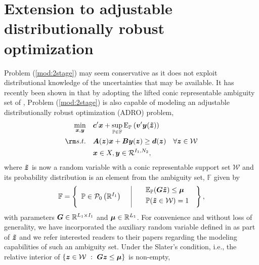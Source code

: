 \documentclass[fleqn,mnsc,blindrev]{informs4}
\newcommand {\Ep}[2]{{\mathrm{E}_{\mathbb{P}_{#1}} \left( #2 \right)}}
\newcommand {\supEp}[1]{\displaystyle \sup_{\mathbb{P} \in \mathbb{F}} \Ep{}{#1}}
\newcommand{\mb}[1]{\mbox{\boldmath \ensuremath{#1}}}
\newcommand{\mbt}[1]{\mb{\tilde{#1}}}
\renewcommand{\Re}{\mathbb{R}}
\begin{document}
		
		\section{Extension to adjustable distributionally robust optimization} \label{sec:ADRO}
Problem (\ref{mod:2stage}) may seem conservative as it does not exploit distributional knowledge of the uncertainties that may be available. It has recently been shown  in \cite{bsz17} that by adopting the lifted conic representable ambiguity set of  \cite{wks14},  Problem (\ref{mod:2stage}) is also capable of modeling an adjustable distributionally robust optimization (ADRO) problem,    
\begin{equation} \label{mod:d2stage}
			\begin{aligned}
				\min_{\boldsymbol{x}, \boldsymbol{y}} \quad & \mb{c}' \mb{x} + \supEp{  \mb{v}'\mb{y}(\mbt{z} )} \\
				{\rm s.t.}\quad &   \mb{A}(\mb{z})\mb{x}+\mb{B}\mb{y}(\mb{z}) \ge \mb{d}(\mb{z}) & \forall \mb{z} \in \mathcal{W}\\
				&\mb{x} \in X, \mb{y}\in \mathcal{R}^{I_1,N_2},
			\end{aligned}
\end{equation}
		where $\mbt{z}$ is now a random variable with a conic representable support set $\mathcal{W}$ and its probability distribution is an element from the ambiguity set, $\mathbb{F}$ given by 
\begin{equation*}
			\mathbb{F}=\left\{
			\begin{array}{lll}
				\mathbb{P}\in\mathcal{P}_{0}\left(\Re^{I_{1}}\right) \enskip & $\vline$ & \enskip
				\begin{array}{l}
					\mathbb{E}_{\mathbb{P}}(\mb{G}\mbt{z}) \leq \mb{\mu} \vspace{3pt}\\
					\mathbb{P}(\mbt{z}\in\mathcal{W})=1 \vspace{3pt}
				\end{array}
			\end{array}
			\right\},
\end{equation*}
		with  parameters $\mb{G} \in \Re^{L_1 \times I_1}$ and $\mb{\mu} \in \Re^{L_1}$. 
		For convenience and without loss of generality, we have incorporated the auxiliary random variable defined in  \cite{bsz17,wks14} as part of  $\mbt{z}$ and we refer interested readers to their papers regarding the modeling capabilities of such an  ambiguity set. Under the Slater's condition, i.e., the relative interior of $\{ \mb{z} \in \mathcal{W}~:~ \mb{G}\mb{z} \leq \mb{\mu}\}$ is non-empty, 
\end{document}
